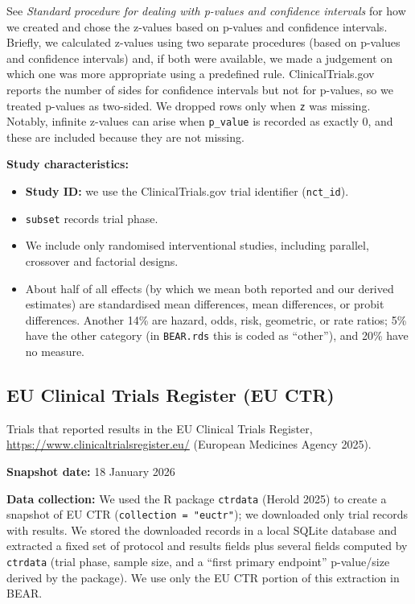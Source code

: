 \documentclass[
  11pt,
]{article}
\providecommand{\tightlist}{%
  \setlength{\itemsep}{0pt}\setlength{\parskip}{0pt}}
\begin{document}
See \emph{Standard procedure for dealing with p-values and confidence
intervals} for how we created and chose the z-values based on p-values
and confidence intervals. Briefly, we calculated z-values using two
separate procedures (based on p-values and confidence intervals) and, if
both were available, we made a judgement on which one was more
appropriate using a predefined rule. ClinicalTrials.gov reports the
number of sides for confidence intervals but not for p-values, so we
treated p-values as two-sided. We dropped rows only when \texttt{z} was
missing. Notably, infinite z-values can arise when \texttt{p\_value} is
recorded as exactly 0, and these are included because they are not
missing.

\textbf{Study characteristics:}

\begin{itemize}
\tightlist
\item
  \textbf{Study ID:} we use the ClinicalTrials.gov trial identifier
  (\texttt{nct\_id}).
\item
  \texttt{subset} records trial phase.
\item
  We include only randomised interventional studies, including parallel,
  crossover and factorial designs.
\item
  About half of all effects (by which we mean both reported and our
  derived estimates) are standardised mean differences, mean
  differences, or probit differences. Another 14\% are hazard, odds,
  risk, geometric, or rate ratios; 5\% have the other category (in
  \texttt{BEAR.rds} this is coded as ``other''), and 20\% have no
  measure.
\end{itemize}

\newpage

\subsection{EU Clinical Trials Register (EU
CTR)}\label{eu-clinical-trials-register-eu-ctr}

Trials that reported results in the EU Clinical Trials Register,
\url{https://www.clinicaltrialsregister.eu/} (European Medicines Agency
2025).

\textbf{Snapshot date:} 18 January 2026

\textbf{Data collection:} We used the R package \texttt{ctrdata} (Herold
2025) to create a snapshot of EU CTR (\texttt{collection\ =\ "euctr"});
we downloaded only trial records with results. We stored the downloaded
records in a local SQLite database and extracted a fixed set of protocol
and results fields plus several fields computed by \texttt{ctrdata}
(trial phase, sample size, and a ``first primary endpoint'' p-value/size
derived by the package). We use only the EU CTR portion of this
extraction in BEAR.
\end{document}
